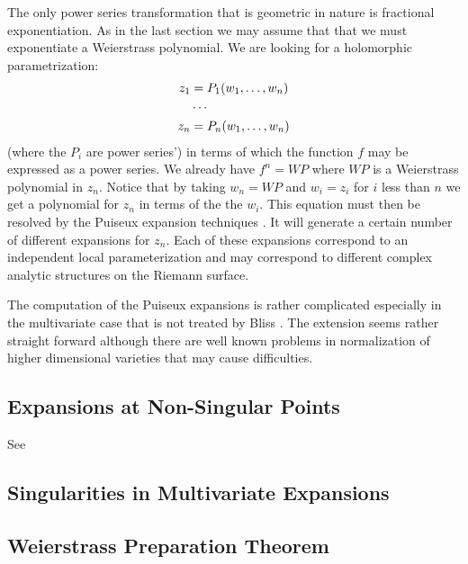The only power series transformation that is geometric in nature is
fractional exponentiation.  As in the last section we may assume that
that we must exponentiate a Weierstrass polynomial.  We are looking
for a holomorphic parametrization:
\[
\begin{aligned}
  z_1 &= P_1(w_1, \ldots ,w_n)\\
    &\cdots\cr
  z_n &= P_n(w_1, \ldots ,w_n)
\end{aligned}
\]
(where the $P_i$ are power series') in terms of which the function $f$
may be expressed as a power series.  We already have $f^n = WP$ where
$WP$ is a Weierstrass polynomial in $z_n$.  Notice that by taking
$w_{n} = WP$ and $w_i = z_i$ for $i$ less than $n$ we get a polynomial
for $z_n$ in terms of the the $w_i$.  This equation must then be
resolved by the Puiseux expansion techniques \cite{Bliss1933-ax}.  It
will generate a certain number of different expansions for $z_n$.
Each of these expansions correspond to an independent local
parameterization and may correspond to different complex analytic
structures on the Riemann surface.

The computation of the Puiseux expansions is rather complicated
especially in the multivariate case that is not treated by Bliss
\cite{Bliss1933-ax}.
The extension seems rather straight forward although there are
well known problems in normalization of higher dimensional varieties
that may cause difficulties.

\subsection{Expansions at Non-Singular Points}

See \cite{Leavitt1966-ao}

\subsection{Singularities in Multivariate Expansions}

\subsection{Weierstrass Preparation Theorem}
